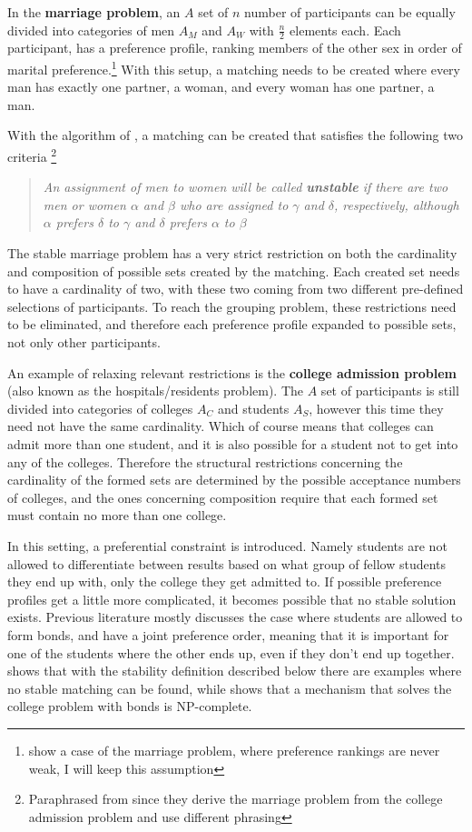 \documentclass{elsarticle}
\begin{document}
In the \textbf{marriage problem}, an $A$ set of $n$ number of participants can be equally divided into categories of men $A_M$ and $A_W$ with $\frac{n}{2}$ elements each. Each participant, has a preference profile, ranking members of the other sex in order of marital preference.\footnote{ \cite{galeshapley62} show a case of the marriage problem, where preference rankings are never weak, I will keep this assumption} With this setup, a matching needs to be created where every man has exactly one partner, a woman, and every woman has one partner, a man.

With the algorithm of \cite{galeshapley62}, a matching can be created that satisfies the following two criteria \footnote{Paraphrased from \cite[p. 10]{galeshapley62} since they derive the marriage problem from the college admission problem and use different phrasing}

\begin{quotation} 
\textit{An assignment of men to women will be called \textbf{unstable} if there are two men or women $\alpha$ and $\beta$ who are assigned to $\gamma$ and $\delta$, respectively, although $\alpha$ prefers $\delta$ to $\gamma$ and $\delta$ prefers $\alpha$ to $\beta$} 
\end{quotation}

The stable marriage problem has a very strict restriction on both the cardinality and composition of possible sets created by the matching. Each created set needs to have a cardinality of two, with these two coming from two different pre-defined selections of participants. To reach the grouping problem, these restrictions need to be eliminated, and therefore each preference profile expanded to possible sets, not only other participants.

An example of relaxing relevant restrictions is the \textbf{college admission problem} (also known as the hospitals/residents problem). The $A$ set of participants is still divided into categories of colleges $A_C$ and students $A_S$, however this time they need not have the same cardinality. Which of course means that colleges can admit more than one student, and it is also possible for a student not to get into any of the colleges. Therefore the structural restrictions concerning the cardinality of the formed sets are determined by the possible acceptance numbers of colleges, and the ones concerning composition require that each formed set must contain no more than one college.

In this setting, a preferential constraint is introduced. Namely students are not allowed to differentiate between results based on what group of fellow students they end up with, only the college they get admitted to. If possible preference profiles get a little more complicated, it becomes possible that no stable solution exists. Previous literature mostly discusses the case where students are allowed to form bonds, and have a joint preference order, meaning that it is important for one of the students where the other ends up, even if they don't end up together. \cite{roth84} shows that with the stability definition described below there are examples where no stable matching can be found, while \cite{ronn90} shows that a mechanism that solves the college problem with bonds is NP-complete.
\end{document}
